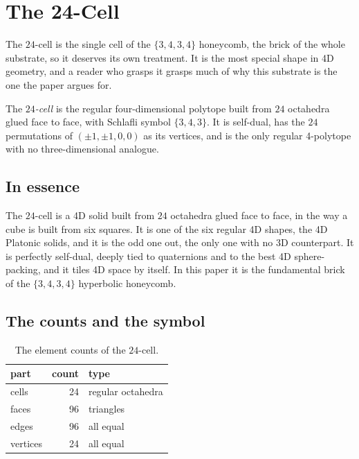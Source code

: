 \section{The 24-Cell}

The $24$-cell is the single cell of the $\{3,4,3,4\}$ honeycomb, the brick of the whole substrate, so it deserves its own treatment. It is the most special shape in 4D geometry, and a reader who grasps it grasps much of why this substrate is the one the paper argues for.

\begin{definition}
The \emph{$24$-cell} is the regular four-dimensional polytope built from $24$ octahedra glued face to face, with Schlafli symbol $\{3,4,3\}$. It is self-dual, has the $24$ permutations of $(\pm 1, \pm 1, 0, 0)$ as its vertices, and is the only regular 4-polytope with no three-dimensional analogue.
\end{definition}

\subsection{In essence}

The $24$-cell is a 4D solid built from $24$ octahedra glued face to face, in the way a cube is built from six squares. It is one of the six regular 4D shapes, the 4D Platonic solids, and it is the odd one out, the only one with no 3D counterpart. It is perfectly self-dual, deeply tied to quaternions and to the best 4D sphere-packing, and it tiles 4D space by itself. In this paper it is the fundamental brick of the $\{3,4,3,4\}$ hyperbolic honeycomb.

\subsection{The counts and the symbol}

\begin{table}[ht]
\centering
\begin{tabular}{@{}lrl@{}}
\toprule
part & count & type \\
\midrule
cells & 24 & regular octahedra \\
faces & 96 & triangles \\
edges & 96 & all equal \\
vertices & 24 & all equal \\
\bottomrule
\end{tabular}
\caption{The element counts of the $24$-cell.}
\end{table}

